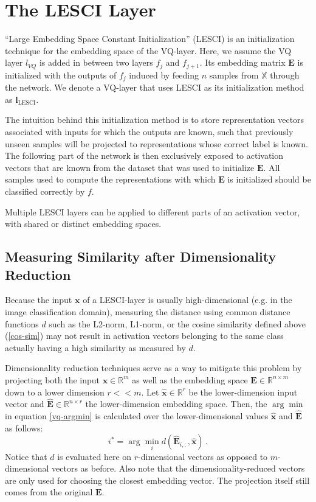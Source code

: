 \documentclass{article}
\begin{document}
\section{The LESCI Layer}

\enquote{Large Embedding Space Constant Initialization} (LESCI) is an initialization technique for the embedding space of the VQ-layer.
Here, we assume the VQ layer $l_{VQ}$ is added in between two layers $f_j$ and $f_{j+1}$.
Its embedding matrix $\bm{E}$ is initialized with the outputs of $f_j$ induced by feeding $n$ samples from $\mathbb{X}$ through the network.
We denote a VQ-layer that uses LESCI as its initialization method as $\bm{l}_\text{LESCI}$.

The intuition behind this initialization method is to store representation vectors associated with inputs for which the outputs are known, such that previously unseen samples will be projected to representations whose correct label is known.
The following part of the network is then exclusively exposed to activation vectors that are known from the dataset that was used to initialize $\bm{E}$.
All samples used to compute the representations with which $\bm{E}$ is initialized should be classified correctly by $f$.

Multiple LESCI layers can be applied to different parts of an activation vector, with shared or distinct embedding spaces.

\subsection{Measuring Similarity after Dimensionality Reduction}
Because the input $\bm{x}$ of a LESCI-layer is usually high-dimensional (e.g. in the image classification domain), measuring the distance using common distance functions $d$ such as the L2-norm, L1-norm, or the cosine similarity defined above (\ref{cos-sim}) may not result in activation vectors belonging to the same class actually having a high similarity as measured by $d$.

Dimensionality reduction techniques serve as a way to mitigate this problem by projecting both the input $\bm{x} \in \mathbb{R}^m$ as well as the embedding space $\bm{E} \in \mathbb{R}^{n \times m}$ down to a lower dimension $r << m$.
Let $\bm{\hat{x}} \in \mathbb{R}^r$ be the lower-dimension input vector and $\bm{\hat{E}} \in \mathbb{R}^{n \times r}$ the lower-dimension embedding space. Then, the $\arg\min$ in equation \ref{vq-argmin} is calculated over the lower-dimensional values $\bm{\hat{x}}$ and $\bm{\hat{E}}$ as follows:
\begin{equation}
    i^*=\arg\min_i d\left(\bm{\hat{E}}_{i,:},\bm{\hat{x}}\right)\,.
\end{equation}
Notice that $d$ is evaluated here on $r$-dimensional vectors as opposed to $m$-dimensional vectors as before.
Also note that the dimensionality-reduced vectors are only used for choosing the closest embedding vector.
The projection itself still comes from the original $\bm{E}$.
\end{document}
